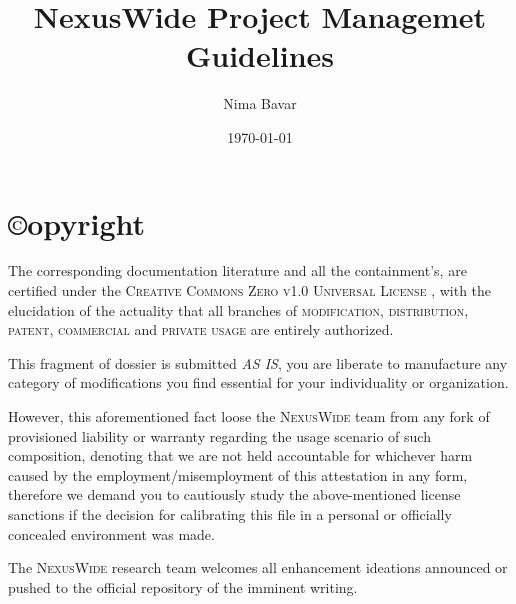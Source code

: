 \documentclass[13pt]{scrarticle}
\title{NexusWide Project Managemet Guidelines}
\author{Nima Bavar}
\date{\today}
\newcommand{\header}[1]{ \textsf{#1} \relax{}}
\newcommand{\important}[1]{\textit{#1}}
\newcommand{\name}[1]{{\textsc{#1}}}
\begin{document}
    \raggedright
    \pagestyle{fancy}


    \fancyhf{}
    \pagestyle{fancy}

    \lhead{\leftmark}
    \rhead{\thepage}



    \thispagestyle{empty}
    \pagecolor{white}


    \thispagestyle{empty}
    \maketitle{}


    \newpage
    \thispagestyle{fancy}
    \setcounter{page}{2}

    \section*{\header{\copyright opyright}}
    \thispagestyle{empty}

    \raggedright
    The corresponding documentation literature and all the containment's, are certified under the \name{Creative Commons Zero v1.0 Universal License} ,
    with the elucidation of the actuality that all branches of \name{modification}, \name{distribution}, \name{patent}, \name{commercial } and \name{private usage } are entirely authorized.
    \newline

    This fragment of dossier is submitted \important{AS IS},
    you are liberate to manufacture any category of modifications you find essential for your individuality or organization.
    \newline

    However, this aforementioned fact loose the \name{NexusWide } team from any fork of provisioned liability or warranty regarding the usage scenario of such composition,
    denoting that we are not held accountable for whichever harm caused by the employment/misemployment of this attestation in any form,
    therefore we demand you to cautiously study the above-mentioned license sanctions if the decision for calibrating this file in a
    personal or officially concealed environment was made. \newline

    The \name{NexusWide } research team welcomes all enhancement ideations announced or pushed to the official repository of the imminent writing.
    \newline
\end{document}
